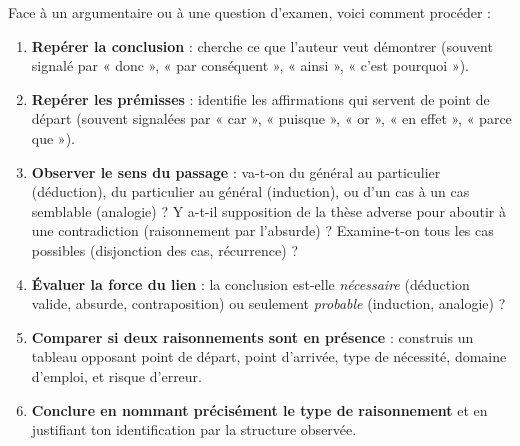 \documentclass[11pt]{article}
\newcommand{\cle}[1]{{\popxbold\color{popdark}#1}}
\begin{document}
\begin{methode}
Face à un argumentaire ou à une question d'examen, voici comment procéder :
\begin{enumerate}
\item \textbf{Repérer la conclusion} : cherche ce que l'auteur veut démontrer (souvent signalé par « donc », « par conséquent », « ainsi », « c'est pourquoi »).
\item \textbf{Repérer les prémisses} : identifie les affirmations qui servent de point de départ (souvent signalées par « car », « puisque », « or », « en effet », « parce que »).
\item \textbf{Observer le sens du passage} : va-t-on du général au particulier (\cle{déduction}), du particulier au général (\cle{induction}), ou d'un cas à un cas semblable (\cle{analogie}) ? Y a-t-il supposition de la thèse adverse pour aboutir à une contradiction (\cle{raisonnement par l'absurde}) ? Examine-t-on tous les cas possibles (\cle{disjonction des cas}, \cle{récurrence}) ?
\item \textbf{Évaluer la force du lien} : la conclusion est-elle \emph{nécessaire} (déduction valide, absurde, contraposition) ou seulement \emph{probable} (induction, analogie) ?
\item \textbf{Comparer si deux raisonnements sont en présence} : construis un tableau opposant point de départ, point d'arrivée, type de nécessité, domaine d'emploi, et risque d'erreur.
\item \textbf{Conclure en nommant précisément le type de raisonnement} et en justifiant ton identification par la structure observée.
\end{enumerate}
\end{methode}
\end{document}
